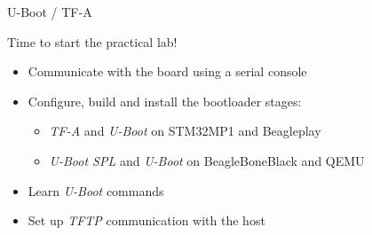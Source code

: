 \setuplabframe
{U-Boot / TF-A}
{
  Time to start the practical lab!
  \begin{itemize}
  \item Communicate with the board using a serial console
  \item Configure, build and install the bootloader stages:
        \begin{itemize}
		\item {\em TF-A} and {\em U-Boot} on STM32MP1 and Beagleplay
		\item {\em U-Boot SPL} and {\em U-Boot} on BeagleBoneBlack and QEMU
	\end{itemize}
  \item Learn {\em U-Boot} commands
  \item Set up {\em TFTP} communication with the host
  \end{itemize}
}
